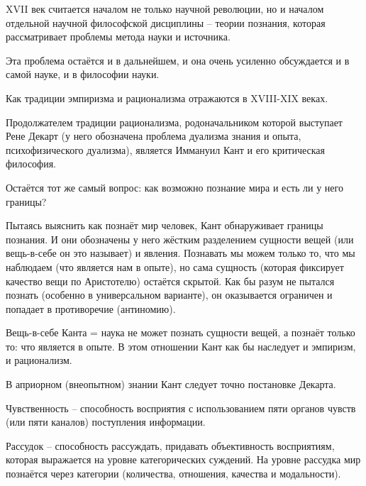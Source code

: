 \documentclass[main.tex]{subfiles}
\begin{document}


XVII век считается началом не только научной революции, но и началом отдельной научной философской дисциплины -- теории познания, которая рассматривает проблемы метода науки и источника.

Эта проблема остаётся и в дальнейшем, и она очень усиленно обсуждается и в самой науке, и в философии науки.

Как традиции эмпиризма и рационализма отражаются в XVIII-XIX веках.



Продолжателем традиции рационализма, родоначальником которой выступает Рене Декарт (у него обозначена проблема дуализма знания и опыта, психофизического дуализма), является Иммануил Кант и его критическая философия.

Остаётся тот же самый вопрос: как возможно познание мира и есть ли у него границы?

Пытаясь выяснить как познаёт мир человек, Кант обнаруживает границы познания.
И они обозначены у него жёстким разделением сущности вещей (или вещь-в-себе он это называет) и явления.
Познавать мы можем только то, что мы наблюдаем (что является нам в опыте), но сама сущность (которая фиксирует качество вещи по Аристотелю) остаётся скрытой.
Как бы разум не пытался познать (особенно в универсальном варианте), он оказывается ограничен и попадает в противоречие (антиномию).

Вещь-в-себе Канта = наука не может познать сущности вещей, а познаёт только то: что является в опыте.
В этом отношении Кант как бы наследует и эмпиризм, и рационализм.

В априорном (внеопытном) знании Кант следует точно постановке Декарта.



Чувственность -- способность восприятия с использованием пяти органов чувств (или пяти каналов) поступления информации.

Рассудок -- способность рассуждать, придавать объективность восприятиям, которая выражается на уровне категорических суждений.
На уровне рассудка мир познаётся через категории (количества, отношения, качества и модальности).
\end{document}

